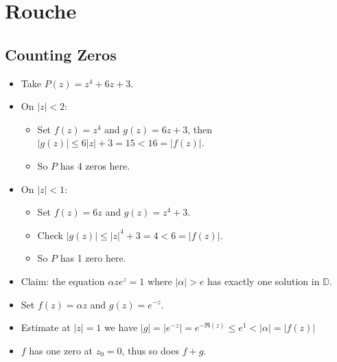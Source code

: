 \hypertarget{rouche}{%
\section{Rouche}\label{rouche}}

\hypertarget{counting-zeros}{%
\subsection{Counting Zeros}\label{counting-zeros}}

\begin{example}

\begin{itemize}
\tightlist
\item
  Take \(P(z) = z^4 + 6z + 3\).
\item
  On \({\left\lvert {z} \right\rvert} < 2\):

  \begin{itemize}
  \tightlist
  \item
    Set \(f(z) = z^4\) and \(g(z) = 6z + 3\), then
    \({\left\lvert {g(z)} \right\rvert} \leq 6{\left\lvert {z} \right\rvert} + 3 = 15 < 16= {\left\lvert {f(z)} \right\rvert}\).
  \item
    So \(P\) has 4 zeros here.
  \end{itemize}
\item
  On \({\left\lvert {z} \right\rvert} < 1\):

  \begin{itemize}
  \tightlist
  \item
    Set \(f(z) = 6z\) and \(g(z) = z^4 + 3\).
  \item
    Check
    \({\left\lvert {g(z)} \right\rvert} \leq {\left\lvert {z} \right\rvert}^4 + 3 = 4 < 6 = {\left\lvert {f(z)} \right\rvert}\).
  \item
    So \(P\) has 1 zero here.
  \end{itemize}
\end{itemize}

\end{example}

\begin{example}

\begin{itemize}
\tightlist
\item
  Claim: the equation \(\alpha z e^z = 1\) where
  \({\left\lvert {\alpha} \right\rvert} > e\) has exactly one solution
  in \({\mathbb{D}}\).
\item
  Set \(f(z) = \alpha z\) and \(g(z) = e^{-z}\).
\item
  Estimate at \({\left\lvert {z} \right\rvert} =1\) we have
  \({\left\lvert {g} \right\rvert} ={\left\lvert {e^{-z}} \right\rvert} = e^{-\Re(z)} \leq e^1 < {\left\lvert {\alpha} \right\rvert} = {\left\lvert {f(z)} \right\rvert}\)
\item
  \(f\) has one zero at \(z_0 = 0\), thus so does \(f+g\).
\end{itemize}

\end{example}

